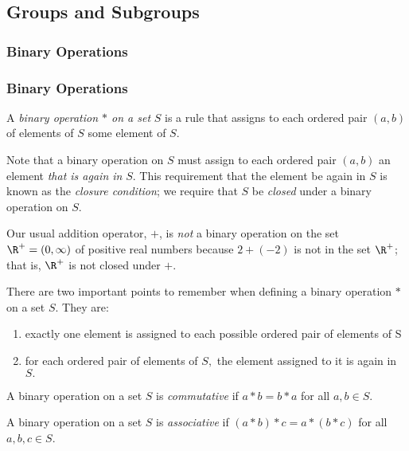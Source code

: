 \subsection{Groups and Subgroups}
{\subsubsection{Binary Operations}}
{\subsubsection{Binary Operations\protect\footnotemark}
}
\begin{definition}
A \emph{binary operation $*$ on a set} $S$ is a rule that assigns to
each ordered pair $(a,b)$ of elements of $S$ some element of $S.$
\end{definition}
Note that a binary operation on $S$ must assign to each ordered pair
$(a,b)$ an element \emph{that is again in} $S.$  This requirement that
the element be again in $S$ is known as the \emph{closure condition};
we require that $S$ be \emph{closed} under a binary operation on $S.$
\begin{example}
Our usual addition operator, $+$, is \emph{not} a binary operation on
the set $\R^+ = (0,\infty)$ of positive real numbers because
$2 + (-2)$ is not in the set $\R^+$; that is, $\R^+$
is not closed under $+.$
\end{example}
There are two important points to remember when defining a binary
operation $*$ on a set $S.$  They are:
\begin{enumerate}
\item exactly one element is assigned to each possible ordered pair of
elements of S
\item for each ordered pair of elements of $S,$ the element assigned
to it is again in $S.$
\end{enumerate}

\begin{definition}
A binary operation on a set $S$ is \emph{commutative} if 
$a * b = b * a$ for all $a, b \in S$.
\end{definition}

\begin{definition}
A binary operation on a set $S$ is \emph{associative} if 
$(a * b) * c = a * (b * c)$ for all $a,b,c \in S$.
\end{definition}

